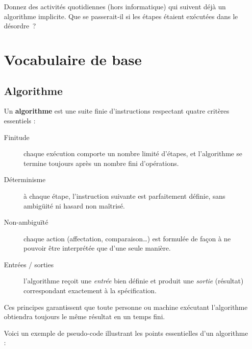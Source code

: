 

\begin{reflexion}
Donnez des activités quotidiennes (hors informatique) qui suivent déjà un
algorithme implicite. Que se passerait‑il si les étapes étaient exécutées dans
le désordre ?
\end{reflexion}

\section{Vocabulaire de base}

\subsection{Algorithme }

Un \textbf{algorithme} est une suite finie d’instructions respectant quatre
critères essentiels :
\begin{description}
  \item[Finitude] chaque exécution comporte un nombre limité d’étapes, et
        l’algorithme se termine toujours après un nombre fini d’opérations.
  \item[Déterminisme] à chaque étape, l’instruction suivante est parfaitement
        définie, sans ambigüité ni hasard non maîtrisé.
  \item[Non-ambiguïté] chaque action (affectation, comparaison…) est formulée
        de façon à ne pouvoir être interprétée que d’une seule manière.
  \item[Entrées / sorties] l’algorithme reçoit une \emph{entrée} bien définie
        et produit une \emph{sortie} (résultat) correspondant exactement à la
        spécification.
\end{description}

Ces principes garantissent que toute personne ou machine exécutant l’algorithme
obtiendra toujours le même résultat en un temps fini.


Voici un exemple de pseudo-code illustrant les points essentielles d'un algorithme :

